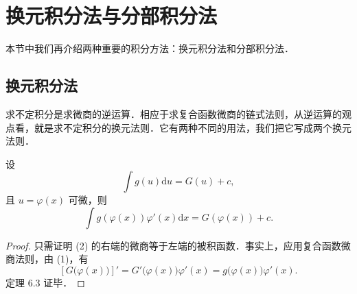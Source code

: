 \section{换元积分法与分部积分法}\label{sec:6.2}

本节中我们再介绍两种重要的积分方法：换元积分法和分部积分法．

\subsection{换元积分法}

求不定积分是求微商的逆运算．相应于求复合函数微商的链式法则，从逆运算的观点看，就是求不定积分的换元法则．它有两种不同的用法，我们把它写成两个换元法则．

\begin{theorem}[第一换元法或凑微分法]\label{thm:6-3}
设
\begin{equation}
\int g(u)\mathrm{d}u = G(u) + c,\tag*{(1)}
\end{equation}
且 $u = \varphi(x)$ 可微，则
\begin{equation}
\int g(\varphi(x))\varphi'(x)\mathrm{d}x = G(\varphi(x)) + c.\tag*{(2)}
\end{equation}
\end{theorem}

\begin{proof}
只需证明 (2) 的右端的微商等于左端的被积函数．事实上，应用复合函数微商法则，由 (1)，有
\[
\left[G\big(\varphi(x)\big)\right]' = G'\big(\varphi(x)\big)\varphi'(x) = g\big(\varphi(x)\big)\varphi'(x).
\]
定理 6.3 证毕．
\end{proof}

